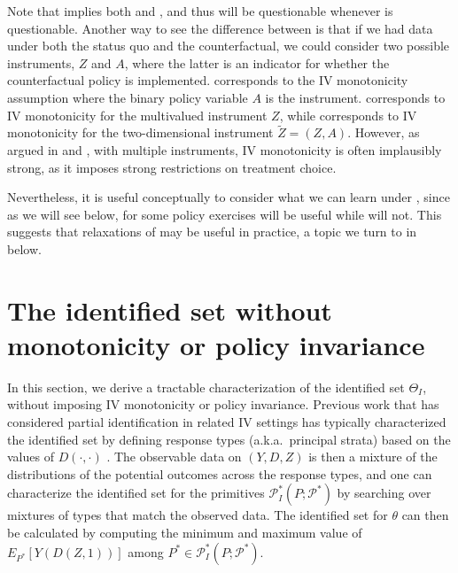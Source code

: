 \documentclass[12pt]{article}%
\theoremstyle{definition}
\newcommand\1{\operatorname{I}\indicatorfence}
\begin{document}
Note that  implies both
 and
, and thus will be questionable
whenever  is questionable. Another way
to see the difference between
is that if we had data under both the status quo and the counterfactual, we
could consider two possible instruments, $Z$ and $A$, where the latter is an
indicator for whether the counterfactual policy is implemented.
 corresponds to the IV monotonicity
assumption where the binary policy variable $A$ is the instrument.
 corresponds to IV monotonicity
for the multivalued instrument $Z$, while 
corresponds to IV monotonicity for the two-dimensional instrument
$\tilde{Z} = (Z, A)$.
%
However, as argued in \textcite{HeUrVy06} and \textcite{mtw21}, with multiple
instruments, IV monotonicity is often implausibly strong, as it imposes strong
 restrictions on treatment choice.
%
%
%
%
%
%

%
%
%
Nevertheless, it is useful conceptually to consider what we can learn
under , since as we will see below, for some
policy exercises  will be useful while
 will not. This suggests that
relaxations of  may be useful in practice, a topic
we turn to in  below.

%
%
%
%
%
%
%
%
%
%
%
%
%

%
%

%
%
%
%
%
%
%
%
%
%
%
%
%
%
%
%
%
%
%
%
%
%
%



%

%

%

%

%
%
%
%


\section{The identified set without monotonicity or policy invariance}\label{sec:no_monotonicity}

In this section, we derive a tractable characterization of the
identified set $\Theta_I$, without imposing IV monotonicity or policy
invariance. Previous work that has considered partial identification in related
IV settings has typically characterized the identified set by defining response
types (a.k.a.\ principal strata) based on the values of $D(\cdot, \cdot)$
\parencite[e.g.][]{kitagawa21, bai_identifying_2024}. The observable data on
$(Y, D, Z)$ is then a mixture of the distributions of the potential outcomes
across the response types, and one can characterize the identified set for the
primitives $\mathcal{P}_I^*(P;\mathcal{P}^{*})$ by searching over mixtures of
types that match the observed data. The identified set for $\theta$ can then be
calculated by computing the minimum and maximum value of $E_{P^*}[Y(D(Z,1))]$
among $P^* \in \mathcal{P}_I^*(P;\mathcal{P}^{*})$.
\end{document}
